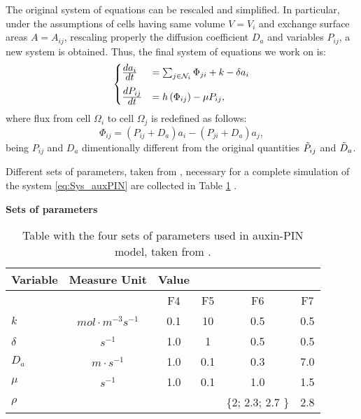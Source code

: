 The original system of equations can be rescaled and simplified. In particular, under the assumptions of cells having same volume $V =V_i$ and exchange surface areas $A = A_{ij}$, rescaling properly the diffusion coefficient $D_a$ and variables $P_{ij}$, a new system is obtained. Thus, the final system of equations we work on is:
\begin{equation}\label{eq:Sys_auxPIN}\begin{aligned}
\begin{cases}
  {\displaystyle d a_i\over\displaystyle d t} & = \sum_{j \in \mathcal{N}_i} \displaystyle \Phi_{ji} +k - \delta a_i \\[8pt]
  {\displaystyle d P_{ij}\over\displaystyle d t} & = h\left(\Phi_{ij}\right) - \mu P_{ij},
\end{cases}
\end{aligned} \end{equation}
where flux from cell $\Omega_i$ to cell $\Omega_j$ is redefined as follows:
\begin{equation}
  \Phi_{ij} = \left( P_{ij} + D_a \right) a_i - \left( P_{ji} + D_a \right) a_j,
\end{equation}
being $P_{ij}$ and $D_a$ dimentionally different from the original quantities $\Tilde{P}_{ij}$ and $\Tilde{D}_a$.

Different sets of parameters, taken from \cite{plant:Farcot}, necessary for a complete simulation of the system \eqref{eq:Sys_auxPIN} are collected in Table \ref{tab:setprm_aux} .
\begin{table}
    \caption*{\textbf{Sets of parameters}}
    \centering
    \begin{tabular}{| p{5em} |c| c c c c|}
    \hline
    \rowcolor{bluepoli!40} %
    \textbf{Variable} & \textbf{Measure Unit} & \textbf{Value} & & & \T\B \\
    \hline \hline
     &  & F4 & F5 & F6 & F7 \T\B \\
    $k$ & $mol \cdot m^{-3} s^{-1} $ & 0.1 & 10 & 0.5 & 0.5 \\
    $\delta$ & $s^{-1} $ & 1.0 & 1 & 0.5 & 0.5\\
    $D_a$ & $m \cdot s^{-1} $ & 1.0 & 0.1 & 0.3 & 7.0\\
    $\mu$ & $s^{-1}$ & 1.0 & 0.1 & 1.0 & 1.5\\
    $\rho$ &  &  &  & \{2; 2.3; 2.7 \} & 2.8\\
    \hline
    \end{tabular}
    \\[10pt]
    \caption{Table with the four sets of parameters used in auxin-PIN model, taken from \cite{plant:Farcot}.}
    \label{tab:setprm_aux}
\end{table}

